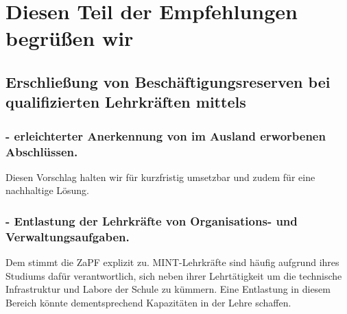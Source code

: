 \documentclass[DIV=calc]{scrartcl}
\begin{document}





\section*{Diesen Teil der Empfehlungen begrüßen wir}
\subsection*{Erschließung von Beschäftigungsreserven bei qualifizierten Lehrkräften mittels}
\subsubsection*{- erleichterter Anerkennung von im Ausland erworbenen Abschlüssen.}
Diesen Vorschlag halten wir für kurzfristig umsetzbar und zudem für eine nachhaltige Lösung.

\subsubsection*{- Entlastung der Lehrkräfte von Organisations- und Verwaltungsaufgaben.}
Dem stimmt die ZaPF explizit zu. MINT-Lehrkräfte sind häufig aufgrund %
ihres Studiums dafür verantwortlich, sich neben ihrer Lehrtätigkeit um die technische Infrastruktur und Labore der Schule zu kümmern. 
Eine Entlastung in diesem Bereich könnte dementsprechend Kapazitäten in der Lehre schaffen.
\end{document}
